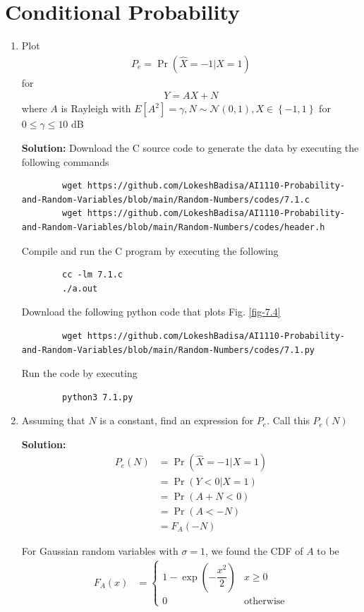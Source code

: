\documentclass[journal,12pt,twocolumn]{IEEEtran}
\newcommand{\solution}{\noindent \textbf{Solution: }}
\providecommand{\pr}[1]{\ensuremath{\Pr\left(#1\right)}}
\providecommand{\brak}[1]{\ensuremath{\left(#1\right)}}
\providecommand{\cbrak}[1]{\ensuremath{\left\{#1\right\}}}
\providecommand{\sbrak}[1]{\ensuremath{\left[#1\right]}}
\providecommand{\gauss}[2]{\mathcal{N}\ensuremath{\left(#1,#2\right)}}
\numberwithin{equation}{section}
\renewcommand\thesection{\arabic{section}}
\begin{document}
	\section{Conditional Probability}
	\begin{enumerate}[label=\thesection.\arabic*,ref=\thesection.\theenumi]
	\item Plot 
	\begin{align}
		P_e = \pr{\hat{X} = -1|X=1}	
	\end{align}
	for 
	\begin{align}
		Y = AX+N
	\end{align}
	where $A$ is Rayleigh with $E\sbrak{A^2} = \gamma, N \sim \gauss{0}{1}, X \in \cbrak{-1,1}$ for $0 \le \gamma \le 10$ dB
	
	\solution Download the C source code to generate the data by executing the following commands
	\begin{lstlisting}
		wget https://github.com/LokeshBadisa/AI1110-Probability-and-Random-Variables/blob/main/Random-Numbers/codes/7.1.c
		wget https://github.com/LokeshBadisa/AI1110-Probability-and-Random-Variables/blob/main/Random-Numbers/codes/header.h
	\end{lstlisting}
	Compile and run the C program by executing the following
	\begin{lstlisting}
		cc -lm 7.1.c
		./a.out
	\end{lstlisting}
	
	Download the following python code that plots Fig. \ref{fig-7.4} 
	\begin{lstlisting}
		wget https://github.com/LokeshBadisa/AI1110-Probability-and-Random-Variables/blob/main/Random-Numbers/codes/7.1.py
	\end{lstlisting}
	Run the code by executing
	\begin{lstlisting}
		python3 7.1.py
	\end{lstlisting}
	
	\item Assuming that $N$ is a constant, find an expression for $P_e$.  Call this $P_e(N)$
	
	\solution 
	\begin{align}
		P_e(N) &= \pr{\hat{X} = -1|X = 1} \\
		&= \pr{Y<0|X=1} \\
		&= \pr{A+N<0} \\
		&= \pr{A<-N} \\
		&= F_A(-N)
	\end{align}
	
	For Gaussian random variables with $\sigma = 1$, we found the CDF of $A$ to be
	\begin{align}
		F_A(x) &= 
		\begin{cases}
			1 - \exp\brak{-\dfrac{x^2}{2}} & x \geq 0 \\
			0 & \text{otherwise}
		\end{cases}
	\end{align}
	

\end{enumerate}
\end{document}

